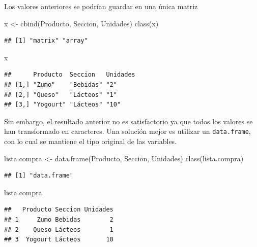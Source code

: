 \documentclass[
]{book}
\newenvironment{Shaded}{\begin{snugshade}}{\end{snugshade}}
\newcommand{\FunctionTok}[1]{\textcolor[rgb]{0.00,0.00,0.00}{#1}}
\newcommand{\NormalTok}[1]{#1}
\newcommand{\OtherTok}[1]{\textcolor[rgb]{0.56,0.35,0.01}{#1}}
\theoremstyle{break}
\theoremstyle{nonumberplain}
\begin{document}
Los valores anteriores se podrían guardar en una única matriz

\begin{Shaded}
\begin{Highlighting}[]
\NormalTok{x }\OtherTok{\textless{}{-}} \FunctionTok{cbind}\NormalTok{(Producto, Seccion, Unidades)}
\FunctionTok{class}\NormalTok{(x)}
\end{Highlighting}
\end{Shaded}

\begin{verbatim}
## [1] "matrix" "array"
\end{verbatim}

\begin{Shaded}
\begin{Highlighting}[]
\NormalTok{x}
\end{Highlighting}
\end{Shaded}

\begin{verbatim}
##      Producto  Seccion   Unidades
## [1,] "Zumo"    "Bebidas" "2"     
## [2,] "Queso"   "Lácteos" "1"     
## [3,] "Yogourt" "Lácteos" "10"
\end{verbatim}

Sin embargo, el resultado anterior no es satisfactorio ya que todos los valores se han transformado en caracteres.
Una solución mejor es utilizar un \texttt{data.frame}, con lo cual se mantiene el tipo original de las variables.

\begin{Shaded}
\begin{Highlighting}[]
\NormalTok{lista.compra }\OtherTok{\textless{}{-}} \FunctionTok{data.frame}\NormalTok{(Producto, Seccion, Unidades)}
\FunctionTok{class}\NormalTok{(lista.compra)}
\end{Highlighting}
\end{Shaded}

\begin{verbatim}
## [1] "data.frame"
\end{verbatim}

\begin{Shaded}
\begin{Highlighting}[]
\NormalTok{lista.compra}
\end{Highlighting}
\end{Shaded}

\begin{verbatim}
##   Producto Seccion Unidades
## 1     Zumo Bebidas        2
## 2    Queso Lácteos        1
## 3  Yogourt Lácteos       10
\end{verbatim}
\end{document}
